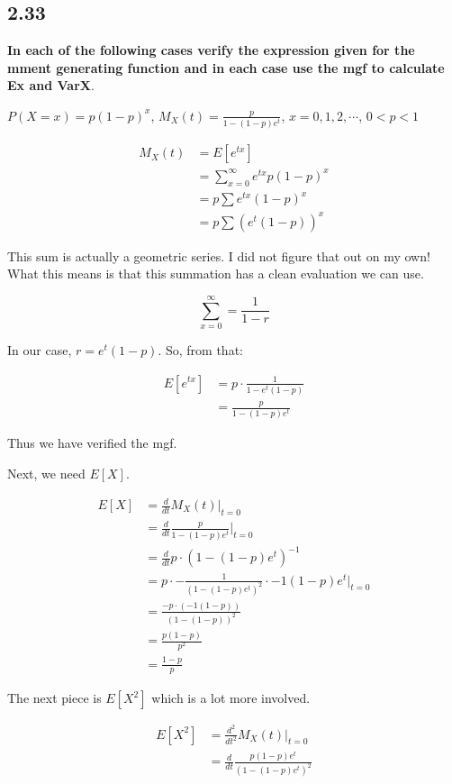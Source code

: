 \subsection*{2.33}

\textbf{In each of the following cases verify the expression given for the mment generating function and in each case use the mgf to calculate Ex and VarX}.

\noindent $P(X=x) = p(1-p)^x$, $M_X(t) = \frac{p}{1-(1-p)e^t}$, $x=0,1,2,\cdots$, $0<p<1$

\begin{align*}
	M_X(t) &= E[e^{tx}] \\
	&= \sum_{x=0}^{\infty} e^{tx} p(1-p)^x \\
	&= p \sum e^{tx} (1-p)^x \\
	&= p \sum \left( e^t(1-p) \right)^x
\end{align*}

This sum is actually a geometric series. I did not figure that out on my own! What this means is that this summation has a clean evaluation we can use.

\[
	\sum_{x=0}^{\infty} = \frac{1}{1-r}
\]

In our case, $r=e^t(1-p)$. So, from that:

\begin{align*}
	E[e^{tx}] &= p \cdot \frac{1}{1 - e^t(1-p)} \\
	&= \frac{p}{1-(1-p)e^t}
\end{align*}

Thus we have verified the mgf.

Next, we need $E[X]$.

\begin{align*}
	E[X] &= \frac{d}{dt} M_X(t) \bigg\rvert_{t=0} \\
	&= \frac{d}{dt} \frac{p}{1-(1-p)e^t} \bigg\rvert_{t=0} \\
	&= \frac{d}{dt} p \cdot (1-(1-p)e^t)^{-1} \\
	&= p \cdot -\frac{1}{(1-(1-p)e^t)^2} \cdot -1(1-p)e^t \bigg\rvert_{t=0} \\
	&= \frac{-p \cdot (-1(1-p))}{(1-(1-p))^2} \\
	&= \frac{p(1-p)}{p^2} \\
	&= \frac{1-p}{p}
\end{align*}

The next piece is $E[X^2]$ which is a lot more involved. 

\begin{align*}
	E[X^2] &= \frac{d^2}{dt^2} M_X(t) \bigg\rvert_{t=0} \\
	&= \frac{d}{dt} \frac{p(1-p)e^t}{(1-(1-p)e^t)^2}
\end{align*}

